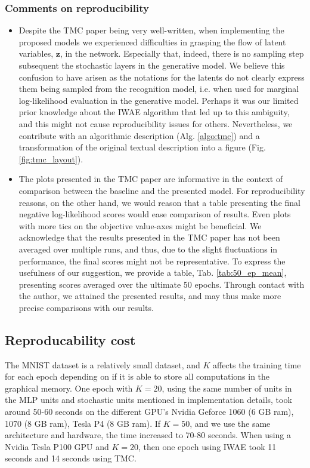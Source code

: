 \subsubsection*{Comments on reproducibility}
\label{sec:com_repro}
\begin{itemize}
    \item Despite the TMC paper being very well-written, when implementing the proposed models we experienced difficulties in grasping the flow of latent variables, $\bm z$, in the network. Especially that, indeed, there is no sampling step subsequent the stochastic layers in the generative model. We believe this confusion to have arisen as the notations for the latents do not clearly express them being sampled from the recognition model, i.e. when used for marginal log-likelihood evaluation in the generative model. Perhaps it was our limited prior knowledge about the IWAE algorithm that led up to this ambiguity, and this might not cause reproducibility issues for others. Nevertheless, we contribute with an algorithmic description (Alg. \ref{algo:tmc}) and a transformation of the original textual description into a figure (Fig. \ref{fig:tmc_layout}).
    \item The plots presented in the TMC paper are informative in the context of comparison between the baseline and the presented model. For reproducibility reasons, on the other hand, we would reason that a table presenting the final negative log-likelihood scores would ease comparison of results. Even plots with more tics on the objective value-axes might be beneficial. We acknowledge that the results presented in the TMC paper has not been averaged over multiple runs, and thus, due to the slight fluctuations in performance, the final scores might not be representative. To express the usefulness of our suggestion, we provide a table, Tab. \ref{tab:50_ep_mean}, presenting 
    scores averaged over the ultimate 50 epochs. Through contact with the author, we attained the presented results, and may thus make more precise comparisons with our results.
    
\end{itemize}

\subsection{Reproducability cost}
The MNIST dataset is a relatively small dataset, and $K$ affects the training time for each epoch depending on if it is able to store all computations in the graphical memory. One epoch with $K=20$, using the same number of units in the MLP units and stochastic units mentioned in implementation details, took around 50-60 seconds on the different GPU's Nvidia Geforce 1060 (6 GB ram), 1070 (8 GB ram), Tesla P4 (8 GB ram). If $K=50$, and we use the same architecture and hardware, the time increased to 70-80 seconds. When using a Nvidia Tesla P100 GPU and $K=20$, then one epoch using IWAE took 11 seconds and 14 seconds using TMC. 

